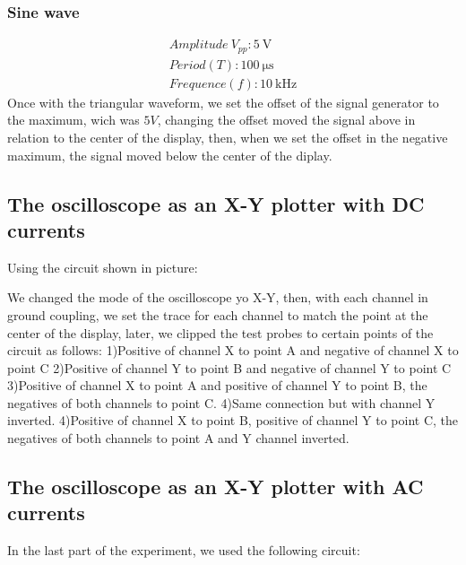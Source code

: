 \documentclass[a4paper]{article}
\begin{document}
\subsubsection*{Sine wave}
\begin{gather*}
    Amplitude\ V_{pp}: \SI{5}{\volt}\\
    Period(T): \SI{100}{\micro\second}\\
    Frequence(f): \SI{10}{\kilo\hertz}
\end{gather*}
Once with the triangular waveform, we set the offset of the signal generator to the maximum, wich
was $5 V$, changing the offset moved the signal above in relation to the center of the display, then, when
we set the offset in the negative maximum, the signal moved below the center of the diplay.
\subsection{The oscilloscope as an X-Y plotter with DC currents}
Using the circuit shown in picture:

We changed the mode of the oscilloscope yo X-Y, then, with each channel in ground coupling, we set
the trace for each channel to match the point at the center of the display, later, we clipped the
test probes to certain points of the circuit as follows:
1)Positive of channel X to point A and negative of channel X to point C
2)Positive of channel Y to point B and negative of channel Y to point C
3)Positive of channel X to point A and positive of channel Y to point B, the negatives of both
channels to point C.
4)Same connection but with channel Y inverted.
4)Positive of channel X to point B, positive of channel Y to point C, the negatives of both
channels to point A and Y channel inverted.
\subsection{The oscilloscope as an X-Y plotter with AC currents}
In the last part of the experiment, we used the following circuit:
\end{document}
